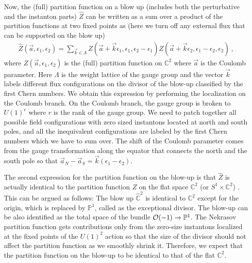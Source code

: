 \documentclass[letterpaper, 11pt]{article}
\def\IC{\mathbb{C}}
\def\IP{\mathbb{P}}
\def\CO{{\cal O}}
\def\e{\epsilon}
\begin{document}
Now, the (full) partition function on a blow up (includes both the perturbative and the instanton parts) $\hat{Z}$ can be written as a sum over a product of the partition functions at two fixed points as (here we turn off any external flux that can be supported on the blow up) \cite{Nekrasov:2003vi, Gottsche:2006bm, Gottsche:2006tn, Gasparim:2008ri, Bonelli:2012ny}
\begin{align} \label{eq:blowup}
 \hat{Z}(\vec{a}, \e_1, \e_2) = \sum_{\vec{k} \in \Lambda} Z(\vec{a}+ \vec{k} \e_1, \e_1, \e_2 - \e_1) Z(\vec{a}+\vec{k} \e_2, \e_1 - \e_2, \e_2) \ , 
\end{align}
where $Z(\vec{a}, \e_1, \e_2)$ is the (full) partition function on $\IC^2$ where $\vec{a}$ is the Coulomb parameter. 
Here $\Lambda$ is the weight lattice of the gauge group and the vector $\vec{k}$ labels different flux configurations on the divisor of the blow-up classified by the first Chern numbers. 
We obtain this expression by performing the localization on the Coulomb branch. On the Coulomb branch, the gauge group is broken to $U(1)^r$ where $r$ is the rank of the gauge group. We need to patch together all possible field configurations with zero sized instantons located at north and south poles, and all the inequivalent configurations are labeled by the first Chern numbers which we have to sum over. The shift of the Coulomb parameter comes from the gauge transformation along the equator that connects the north and the south pole so that $\vec{a}_N - \vec{a}_S = \vec{k} (\e_1 - \e_2)$. 


The second expression for the partition function on the blow-up is that $\hat{Z}$ is actually identical to the partition function $Z$ on the flat space $\IC^2$ (or $S^1 \times \IC^2$) \cite{Nakajima:2003pg, Nakajima:2003uh,Nakajima:2005fg}. This can be argued as follows: The blow up $\hat{\IC}^2$ is identical to $\IC^2$ except for the origin, which is replaced by $\IP^1$, called as the exceptional divisor. The blow-up can be also identified as the total space of the bundle $\CO(-1) \to \IP^1$. 
The Nekrasov partition function gets contributions only from the zero-size instantons localized at the fixed points of the $U(1)^2$ action so that the size of the divisor should not affect the partition function as we smoothly shrink it. Therefore, we expect that the partition function on the blow-up to be identical to that of the flat $\IC^2$.
\end{document}
